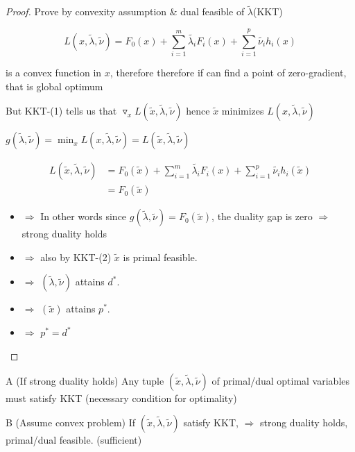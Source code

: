 \begin{proof}
	Prove by convexity assumption \& dual feasible of $\tilde{\lambda}$(KKT)
	
	\begin{equation*}
	L(x,\tilde{\lambda}, \tilde{\nu}) = F_0(x) + \sum^m_{i=1}\tilde{\lambda_i}F_i(x) + \sum^p_{i=1}\tilde{\nu_i}h_i(x)
	\end{equation*}
	
	is a convex function in $x$, therefore therefore if can find a point of zero-gradient, that is global optimum
	
	But KKT-(1) tells us that $\triangledown_xL(\tilde{x},\tilde{\lambda},\tilde{\nu})$ hence $\tilde{x}$ minimizes $L(x,\tilde{\lambda},\tilde{\nu})$
	
	$g(\tilde{\lambda}, \tilde{\nu}) = \min_xL(x,\tilde{\lambda},\tilde{\nu}) = L(\tilde{x},\tilde{\lambda},\tilde{\nu})$
	
	
	\begin{align*}
	L(\tilde{x},\tilde{\lambda},\tilde{\nu}) &= F_0(\tilde{x}) + \sum^m_{i=1}\tilde{\lambda_i}F_i(x) + \sum^p_{i=1}\tilde{\nu_i}h_i(\tilde{x})\\
	&= F_0(\tilde{x})
	\end{align*}
	
	\begin{itemize}
		\item $\Rightarrow$ In other words since $g(\tilde{\lambda},\tilde{\nu}) = F_0(\tilde{x})$, the duality gap is zero $\Rightarrow$ strong duality holds
		
		\item $\Rightarrow$ also by KKT-(2) $\tilde{x}$ is primal feasible.
		
		\item $\Rightarrow$ $(\tilde{\lambda},\tilde{\nu})$ attains $d^*$.
		
		\item $\Rightarrow$ $(\tilde{x})$ attains $p^*$.
		
		\item $\Rightarrow$ $p^* = d^*$
	\end{itemize}
\end{proof}

\begin{theorem}{A}
	(If strong duality holds) Any tuple $(\tilde{x},\tilde{\lambda},\tilde{\nu})$ of primal/dual optimal variables must satisfy KKT (necessary condition for optimality)
\end{theorem}

\begin{theorem}{B}
	(Assume convex problem) If $(\tilde{x},\tilde{\lambda},\tilde{\nu})$ satisfy KKT, $\Rightarrow$ strong duality holds, primal/dual feasible. (sufficient)
\end{theorem}

